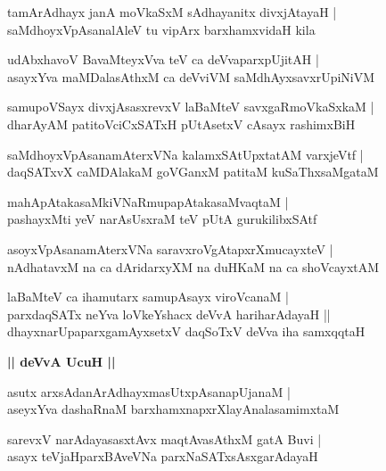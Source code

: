\documentclass[twoside,12pt,openright]{book}
\newcounter{shloka}[chapter]
\def\uvaca#1{\centerline{{\large\textbf{#1}}}}
\begin{document}
\begin{shloka}%
tamArAdhayx janA moVkaSxM sAdhayanitx divxjAtayaH |\\
saMdhoyxVpAsanalAleV tu vipArx barxhamxvidaH kila
\end{shloka}

\begin{shloka}%
udAbxhavoV BavaMteyxVva teV ca deVvaparxpUjitAH |\\
asayxYva maMDalasAthxM ca deVviVM saMdhAyxsavxrUpiNiVM 
\end{shloka}

\begin{shloka}%
samupoVSayx divxjAsasxrevxV laBaMteV savxgaRmoVkaSxkaM |\\
dharAyAM patitoVciCxSATxH pUtAsetxV cAsayx rashimxBiH 
\end{shloka}

\begin{shloka}%
saMdhoyxVpAsanamAterxVNa kalamxSAtUpxtatAM varxjeVtf |\\
daqSATxvX caMDAlakaM goVGanxM patitaM kuSaThxsaMgataM 
\end{shloka}

\begin{shloka}%
mahApAtakasaMkiVNaRmupapAtakasaMvaqtaM |\\
pashayxMti yeV narAsUsxraM teV pUtA gurukilibxSAtf 
\end{shloka}

\begin{shloka}%
asoyxVpAsanamAterxVNa saravxroVgAtapxrXmucayxteV |\\
nAdhatavxM na ca dAridarxyXM na duHKaM na ca shoVcayxtAM 
\end{shloka}

\begin{shloka}%
laBaMteV ca ihamutarx samupAsayx viroVcanaM |\\
parxdaqSATx neYva loVkeYshacx deVvA hariharAdayaH ||\\
dhayxnarUpaparxgamAyxsetxV daqSoTxV deVva iha samxqqtaH 
\end{shloka}

\uvaca{|| deVvA UcuH ||}

\begin{shloka}%
asutx arxsAdanArAdhayxmasUtxpAsanapUjanaM |\\
aseyxYva dashaRnaM barxhamxnapxrXlayAnalasamimxtaM 
\end{shloka}

\begin{shloka}%
sarevxV narAdayasasxtAvx maqtAvasAthxM gatA Buvi |\\
asayx teVjaHparxBAveVNa parxNaSATxsAsxgarAdayaH 
\end{shloka}
\end{document}
